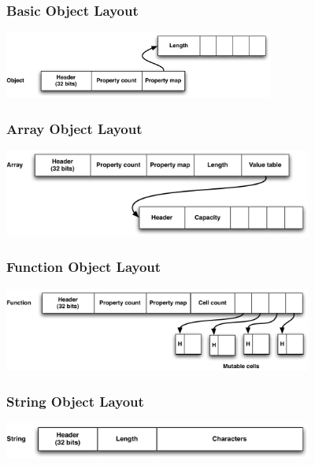 \begin{frame}
\frametitle{\bf Basic Object Layout}

\begin{center}
\includegraphics[width=3.5in]{images/obj_layout_basic}
\end{center}
\end{frame}

\begin{frame}
\frametitle{\bf Array Object Layout}

\begin{center}
\includegraphics[width=4in]{images/obj_layout_array}
\end{center}
\end{frame}

\begin{frame}
\frametitle{\bf Function Object Layout}

\begin{center}
\includegraphics[width=4in]{images/obj_layout_func}
\end{center}
\end{frame}

\begin{frame}
\frametitle{\bf String Object Layout}

\begin{center}
\includegraphics[width=4in]{images/obj_layout_str}
\end{center}
\end{frame}

